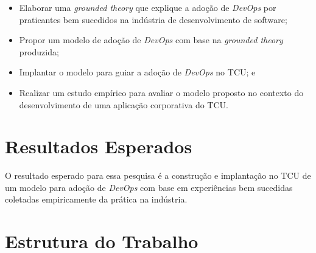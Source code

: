 \begin{itemize}
\item Elaborar uma \textit{grounded theory} que explique a adoção
de \textit{DevOps} por praticantes bem sucedidos na indústria de desenvolvimento
de software;
\item Propor um modelo de adoção de \textit{DevOps} com base na
\textit{grounded theory} produzida;
\item Implantar o modelo para guiar a adoção de \textit{DevOps} no \acrshort{TCU}; e
\item Realizar um estudo empírico para avaliar o modelo proposto no contexto
do desenvolvimento de uma aplicação corporativa do \acrshort{TCU}.
\end{itemize}

\section{Resultados Esperados}
O resultado esperado para essa pesquisa é a construção e implantação no
\acrshort{TCU} de um modelo para adoção de \textit{DevOps} com base em
experiências bem sucedidas coletadas empiricamente da prática na indústria.

\section{Estrutura do Trabalho}


